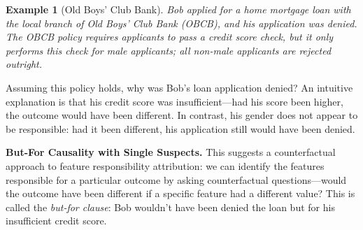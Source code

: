 \documentclass[twoside,11pt]{article}
\newtheorem{example}{Example}
\begin{document}
\begin{example}[Old Boys' Club Bank] Bob applied for a home mortgage loan with the local branch of Old Boys’ Club Bank (OBCB), and his application was denied. The OBCB policy requires applicants to pass a credit score check, but it only performs this check for male applicants; all non-male applicants are rejected outright. \label{ex:obcb}
\end{example}
\noindent Assuming this policy holds, why was Bob’s loan application denied? An intuitive explanation is that his credit score was insufficient—had his score been higher, the outcome would have been different. In contrast, his gender does not appear to be responsible: had it been different, his application still would have been denied.



\vspace{2mm}
\noindent \textbf{But-For Causality with Single Suspects.} This suggests a counterfactual approach to feature responsibility attribution: we can identify the features responsible for a particular outcome by asking counterfactual questions—would the outcome have been different if a specific feature had a different value? This is called the \textit{but-for clause}: Bob wouldn’t have been denied the loan but for his insufficient credit score.  
\end{document}
